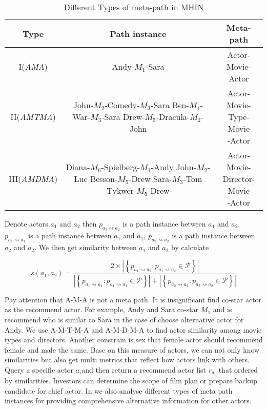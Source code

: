 \begin{table}[!htb]
  \centering
  \begin{tabular}{c|c|c}
  \hline
  Type & Path instance & Meta-path \\
  \hline
  I(\emph{AMA})& Andy-$M_1$-Sara & \tabincell{c}{Actor-\\Movie-Actor}  \\
  \hline
  II(\emph{AMTMA}) & \tabincell{c}{John-$M_2$-Comedy-$M_3$-Sara\\Ben-$M_4$-War-$M_3$-Sara\\Drew-$M_5$-Dracula-$M_2$-John} & \tabincell{c}{Actor-Movie-\\Type-Movie\\-Actor} \\
  \hline
  III(\emph{AMDMA}) & \tabincell{c}{Diana-$M_6$-Spielberg-$M_1$-Andy\\John-$M_2$-Luc Besson-$M_5$-Drew\\Sara-$M_3$-Tom Tykwer-$M_5$-Drew} & \tabincell{c}{Actor-Movie-\\Director-Movie\\-Actor}\\
  \hline
  \end{tabular}
  \caption{Different Types of meta-path in MHIN}
  \label{tab:metapath}
\end{table}

Denote actors $a_1$ and $a_2$ then $p_{a_1 \rightsquigarrow a_2}$ is a path instance between $a_1$ and $a_2$, $p_{a_1 \rightsquigarrow a_1}$ is a path instance between $a_1$ and $a_1$, $p_{a_2 \rightsquigarrow a_2}$ is a path instance between $a_2$ and $a_2$. We then get similarity between $a_1$ and $a_2$ by calculate

\begin{equation}
  s(a_1,a_2) = \frac{2 \times |\left\{p_{a_1 \rightsquigarrow a_2}: p_{a_1 \rightsquigarrow a_2} \in \mathcal{P} \right\}|}{|\left\{p_{a_1 \rightsquigarrow a_1}: p_{a_1 \rightsquigarrow a_1} \in \mathcal{P} \right\}| + |\left\{p_{a_2 \rightsquigarrow a_2}: p_{a_2 \rightsquigarrow a_2} \in \mathcal{P} \right\}|}
\end{equation}

Pay attention that A-M-A is not a meta path. It is insignificant find co-star actor as the recommend actor. For example, Andy and Sara co-star $M_1$ and is recommend who is similar to Sara in the case of choose alternative actor for Andy. We use A-M-T-M-A and A-M-D-M-A to find actor similarity among movie types and directors. Another constrain is sex that female actor should recommend female and male the same. Base on this measure of actors, we can not only know similarities but also get multi metrics that reflect how actors link with others. Query a specific actor $a_i$and then return a recommend actor list $r_{a_i}$ that ordered by similarities. Investors can determine the scope of film plan or prepare backup candidate for chief actor. In \system we also analyse different types of meta path instances for providing comprehensive alternative information for other actors.
